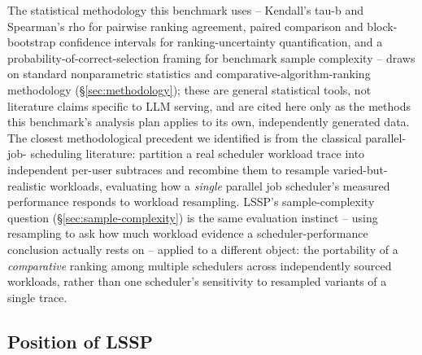 The statistical methodology this benchmark uses -- Kendall's tau-b and
Spearman's rho for pairwise ranking agreement, paired comparison and
block-bootstrap confidence intervals for ranking-uncertainty
quantification, and a probability-of-correct-selection framing for
benchmark sample complexity -- draws on standard nonparametric statistics
and comparative-algorithm-ranking methodology (\S\ref{sec:methodology});
these are general statistical tools, not literature claims specific to LLM
serving, and are cited here only as the methods this benchmark's analysis
plan applies to its own, independently generated data. The closest
methodological precedent we identified is from the classical parallel-job-
scheduling literature: \citet{zakay2014resampling} partition a real
scheduler workload trace into independent per-user subtraces and recombine
them to resample varied-but-realistic workloads, evaluating how a
\emph{single} parallel job scheduler's measured performance responds to
workload resampling. LSSP's sample-complexity question
(\S\ref{sec:sample-complexity}) is the same evaluation instinct --
using resampling to ask how much workload evidence a scheduler-performance
conclusion actually rests on -- applied to a different object: the
portability of a \emph{comparative} ranking among multiple schedulers
across independently sourced workloads, rather than one scheduler's
sensitivity to resampled variants of a single trace.

\subsection{Position of LSSP}
\label{sec:related-position}


